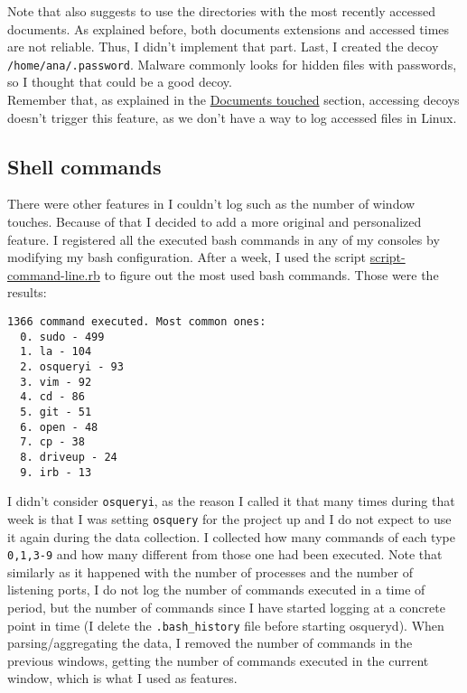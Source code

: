 \documentclass[oneside, 12pt]{article}
\begin{document}
Note that \cite{ruu_journal} also suggests to use the directories with the most recently accessed documents.
As explained before, both documents extensions and accessed times are not reliable.
Thus, I didn't implement that part.
Last, I created the decoy \texttt{/home/ana/.password}.
Malware commonly looks for hidden files with passwords, so I thought that could be a good decoy.\\

Remember that, as explained in the \hyperref[sec:doc]{Documents touched} section, accessing decoys doesn't trigger this feature, as we don't have a way to log accessed files in Linux.

\subsection{Shell commands}

There were other features in \cite{ruu_journal} I couldn't log such as the number of window touches.
Because of that I decided to add a more original and personalized feature.
I registered all the executed bash commands in any of my consoles by modifying my bash configuration.
After a week, I used the script \href{https://github.com/Ana06/are-you-you/blob/master/script-command-line.rb}{script-command-line.rb} to figure out the most used bash commands.
Those were the results:
\begin{lstlisting}
1366 command executed. Most common ones:
  0. sudo - 499
  1. la - 104
  2. osqueryi - 93
  3. vim - 92
  4. cd - 86
  5. git - 51
  6. open - 48
  7. cp - 38
  8. driveup - 24
  9. irb - 13
\end{lstlisting}

I didn't consider \texttt{osqueryi}, as the reason I called it that many times during that week is that I was setting \texttt{osquery} for the project up and I do not expect to use it again during the data collection.
I collected how many commands of each type \texttt{0,1,3-9} and how many different from those one had been executed.
Note that similarly as it happened with the number of processes and the number of listening ports, I do not log the number of commands executed in a time of period, but the number of commands since I have started logging at a concrete point in time (I delete the \texttt{.bash\_history} file before starting osqueryd).
When parsing/aggregating the data, I removed the number of commands in the previous windows, getting the number of commands executed in the current window, which is what I used as features.\\
\end{document}

